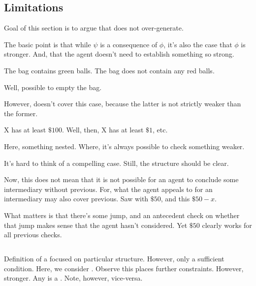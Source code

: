 \subsection{Limitations}
\label{sec:limitations}

\begin{note}
  Goal of this section is to argue that \ideaCS{} does not over-generate.
\end{note}

\begin{note}
  The basic point is that while \(\psi\) is a consequence of \(\phi\), it's also the case that \(\phi\) is stronger.
  And, that the agent doesn't need to establish something so strong.
\end{note}

\begin{note}
  The bag contains green balls.
  The bag does not contain any red balls.

  Well, possible to empty the bag.

  However, \crequ{} doesn't cover this case, because the latter is not strictly weaker than the former.
\end{note}

\begin{note}
  X has at least \(\$100\).
  Well, then, X has at least \(\$1\), etc.

  Here, something nested.
  Where, it's always possible to check something weaker.

  It's hard to think of a compelling case.
  Still, the structure should be clear.

  Now, this does not mean that it is not possible for an agent to conclude some intermediary without previous.
  For, what the agent appeals to for an intermediary may also cover previous.
  Saw with \(\$50\), and this \indicateV{} \(\$50 - x\).

  What matters is that there's some jump, and an antecedent check on whether that jump makes sense that the agent hasn't considered.
  Yet \(\$50\) clearly works for all previous checks.
\end{note}

\subsection{}
\label{sec:prequ3}

\begin{note}
  Definition of a \requ{} focused on particular structure.
  However, only a sufficient condition.
  Here, we consider \prequ{}.
  Observe this places further constraints.
  However, stronger.
  Any \prequ{} is a \crequ{}.
  Note, however, vice-versa.
\end{note}

